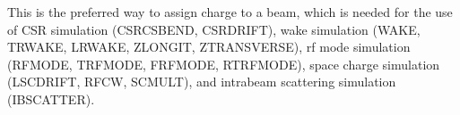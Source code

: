 This is the preferred way to assign charge to a beam, which is needed for the use of CSR simulation (CSRCSBEND, CSRDRIFT),
wake simulation (WAKE, TRWAKE, LRWAKE, ZLONGIT, ZTRANSVERSE), rf mode simulation (RFMODE, TRFMODE, FRFMODE, RTRFMODE),
space charge simulation (LSCDRIFT, RFCW, SCMULT), and intrabeam scattering simulation (IBSCATTER).

